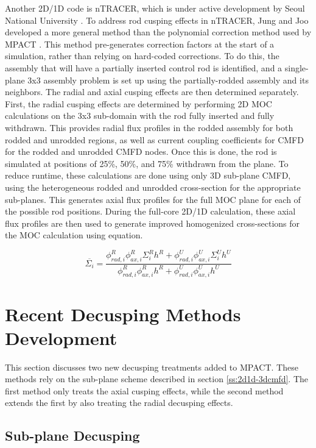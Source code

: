 Another 2D/1D code is nTRACER, which is under active development by Seoul National University \cite{RyuBEAVRSnTRACER2015}.  To address rod cusping effects in nTRACER, Jung and Joo developed a more general method than the polynomial correction method used by MPACT \cite{ICAPPcontrolRodDecuspingNTRACER}.  This method pre-generates correction factors at the start of a simulation, rather than relying on hard-coded corrections.  To do this, the assembly that will have a partially inserted control rod is identified, and a single-plane 3x3 assembly problem is set up using the partially-rodded assembly and its neighbors.  The radial and axial cusping effects are then determined separately.  First, the radial cusping effects are determined by performing 2D MOC calculations on the 3x3 sub-domain with the rod fully inserted and fully withdrawn.  This provides radial flux profiles in the rodded assembly for both rodded and unrodded regions, as well as current coupling coefficients for CMFD for the rodded and unrodded CMFD nodes.  Once this is done, the rod is simulated at positions of 25\%, 50\%, and 75\% withdrawn from the plane.  To reduce runtime, these calculations are done using only 3D sub-plane CMFD, using the heterogeneous rodded and unrodded cross-section for the appropriate sub-planes.  This generates axial flux profiles for the full MOC plane for each of the possible rod positions.  During the full-core 2D/1D calculation, these axial flux profiles are then used to generate improved homogenized cross-sections for the MOC calculation using equation.

\begin{equation}\label{e:nTRACERdecusping}
\overline{\Sigma_i} = \frac{\phi_{rad,i}^R \phi_{ax,i}^R \Sigma_i^R h^R + \phi_{rad,i}^U \phi_{ax,i}^U \Sigma_i^U h^U}{\phi_{rad,i}^R \phi_{ax,i}^R h^R + \phi_{rad,i}^U \phi_{ax,i}^U h^U}
\end{equation}

\section{Recent Decusping Methods Development}

This section discusses two new decusping treatments added to MPACT.  These methods rely on the sub-plane scheme described in section \ref{ss:2d1d-3dcmfd}.  The first method only treats the axial cusping effects, while the second method extends the first by also treating the radial decusping effects.

\subsection{Sub-plane Decusping}

